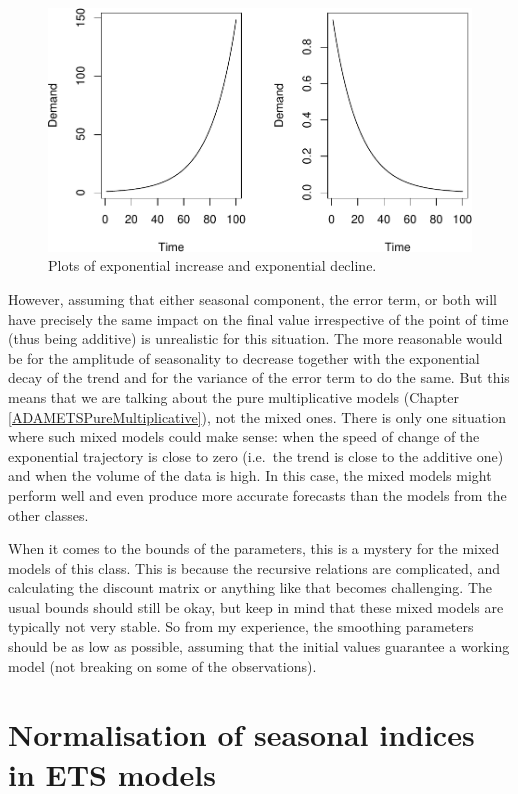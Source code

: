 \documentclass[]{book}
\theoremstyle{definition}
\theoremstyle{definition}
\theoremstyle{definition}
\theoremstyle{definition}
\theoremstyle{remark}
\begin{document}
\begin{figure}
\centering
\includegraphics{Svetunkov--2022----ADAM_files/figure-latex/plotsOfExponent-1.pdf}
\caption{\label{fig:plotsOfExponent}Plots of exponential increase and exponential decline.}
\end{figure}

However, assuming that either seasonal component, the error term, or both will have precisely the same impact on the final value irrespective of the point of time (thus being additive) is unrealistic for this situation. The more reasonable would be for the amplitude of seasonality to decrease together with the exponential decay of the trend and for the variance of the error term to do the same. But this means that we are talking about the pure multiplicative models (Chapter \ref{ADAMETSPureMultiplicative}), not the mixed ones. There is only one situation where such mixed models could make sense: when the speed of change of the exponential trajectory is close to zero (i.e.~the trend is close to the additive one) and when the volume of the data is high. In this case, the mixed models might perform well and even produce more accurate forecasts than the models from the other classes.

When it comes to the bounds of the parameters, this is a mystery for the mixed models of this class. This is because the recursive relations are complicated, and calculating the discount matrix or anything like that becomes challenging. The usual bounds should still be okay, but keep in mind that these mixed models are typically not very stable. So from my experience, the smoothing parameters should be as low as possible, assuming that the initial values guarantee a working model (not breaking on some of the observations).

\hypertarget{ADAMETSSeasonalNormalisation}{%
\section{Normalisation of seasonal indices in ETS models}\label{ADAMETSSeasonalNormalisation}}
\end{document}
